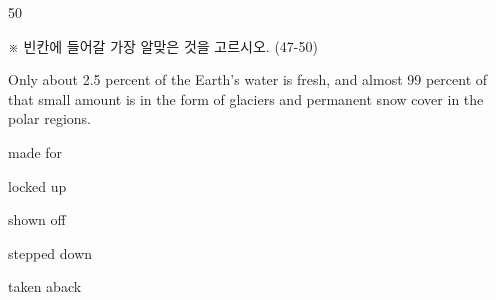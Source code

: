 \begin{question}{50}
\begin{framedtext}
※ 빈칸에 들어갈 가장 알맞은 것을 고르시오. (47-50) \par
\end{framedtext}
Only about 2.5 percent of the Earth's water is fresh, and almost 99 percent of that small amount is \blank{} in the form of glaciers and permanent snow cover in the polar regions.
\begin{choices}
  \item made for
  \item locked up
  \item shown off
  \item stepped down
  \item taken aback
\end{choices}
\end{question}
